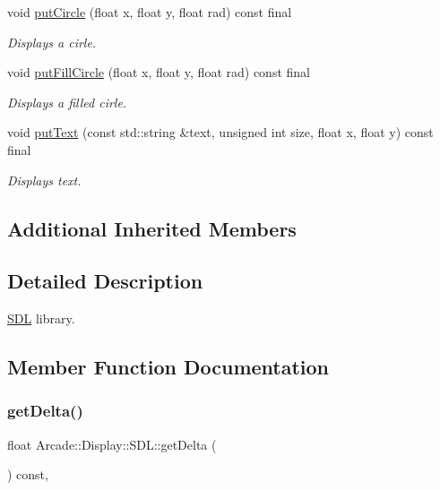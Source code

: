 \begin{DoxyCompactItemize}
void \mbox{\hyperlink{classArcade_1_1Display_1_1SDL_af289c27eb970e81918b4cca36f25e0cf}{put\+Circle}} (float x, float y, float rad) const final
\begin{DoxyCompactList}\small\item\em Displays a cirle. \end{DoxyCompactList}\item 
void \mbox{\hyperlink{classArcade_1_1Display_1_1SDL_a95422e57b7ce4222f7e8d4aa022f36b4}{put\+Fill\+Circle}} (float x, float y, float rad) const final
\begin{DoxyCompactList}\small\item\em Displays a filled cirle. \end{DoxyCompactList}\item 
void \mbox{\hyperlink{classArcade_1_1Display_1_1SDL_aa3bd454c083beb16300bb799ed268ef7}{put\+Text}} (const std\+::string \&text, unsigned int size, float x, float y) const final
\begin{DoxyCompactList}\small\item\em Displays text. \end{DoxyCompactList}\end{DoxyCompactItemize}
\subsection*{Additional Inherited Members}


\subsection{Detailed Description}
\mbox{\hyperlink{classArcade_1_1Display_1_1SDL}{S\+DL}} library. 

\subsection{Member Function Documentation}
\mbox{\label{classArcade_1_1Display_1_1SDL_a1ca09d130dea3bec2481eb72a49c0f03}} 
\subsubsection{\texorpdfstring{getDelta()}{getDelta()}}
{\footnotesize\ttfamily float Arcade\+::\+Display\+::\+S\+D\+L\+::get\+Delta (\begin{DoxyParamCaption}{ }\end{DoxyParamCaption}) const\hspace{0.3cm}{\ttfamily [final]}, {\ttfamily [virtual]}}



